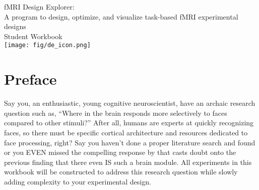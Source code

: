 \documentclass[10pt]{article}
\begin{document}


\begin{titlepage}
	\vspace*{\fill}
	\begin{center}
		\Huge{fMRI Design Explorer:} \\
		\vspace{3mm}
		\LARGE{A program to design, optimize, and visualize task-based fMRI experimental designs} \\
		\vspace{8mm}
		\LARGE{Student Workbook} \\
		\vspace*{\fill}
		\texttt{[image: fig/de\_icon.png]}
	\end{center}
	\vspace*{\fill}
\end{titlepage}
\newpage


\hypersetup{
	linkcolor=black,
	}
\tableofcontents
\label{sec:toc}
\newpage


\listoffigures
\newpage


\renewcommand{\footrulewidth}{0.5pt}
\setcounter{page}{1}
\setcounter{section}{1000}
\section{Preface}
\label{sec:pref}
	Say you, an enthusiastic, young cognitive neuroscientist, have an archaic research question such as, ``Where in the brain responds more selectively to faces compared to other stimuli?''
	After all, humans are experts at quickly recognizing faces, so there must be specific cortical architecture and resources dedicated to face processing, right?
	Say you haven't done a proper literature search and found  or you EVEN missed the compelling response by  that casts doubt onto the previous finding that there even IS such a brain module.
	All experiments in this workbook will be constructed to address this research question while slowly adding complexity to your experimental design.
\end{document}
